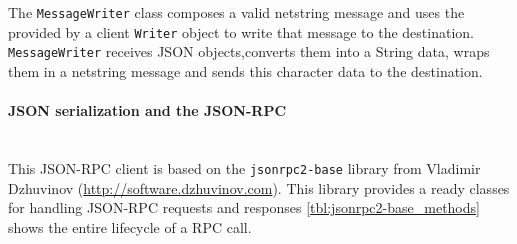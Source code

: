 The \texttt{MessageWriter} class composes a valid netstring message and  uses  the provided
by a client \texttt{Writer} object to write that message to the destination.
\texttt{MessageWriter} receives JSON  objects,converts them into a String data, wraps them
in a netstring message and sends this character data to the destination.

\paragraph{JSON serialization and the JSON-RPC} ~\\

This JSON-RPC client is based on the \texttt{jsonrpc2-base} library from
Vladimir Dzhuvinov (\url{http://software.dzhuvinov.com}).
This library provides a ready classes for handling JSON-RPC requests and
responses 
\autoref{tbl:jsonrpc2-base_methods} shows the entire lifecycle of a RPC call.



